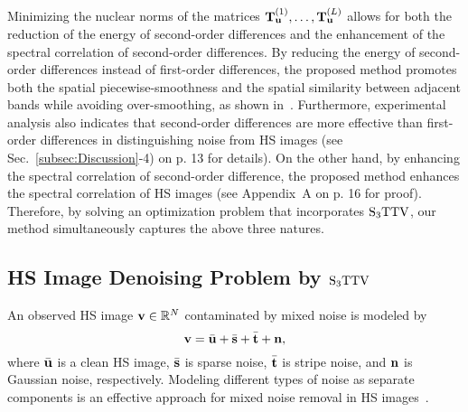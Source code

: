 Minimizing the nuclear norms of the matrices $\mathbf{T}_{\mathbf{u}}^{(1)}, \ldots, \mathbf{T}_{\mathbf{u}}^{(L)}$ allows for both the reduction of the energy of second-order differences and the enhancement of the spectral correlation of second-order differences. By reducing the energy of second-order differences instead of first-order differences, the proposed method promotes both the spatial piecewise-smoothness and the spatial similarity between adjacent bands while avoiding over-smoothing, as shown in~\cite{Aggarwal2016SSTV}. Furthermore, experimental analysis also indicates that second-order differences are more effective than first-order differences in distinguishing noise from HS images (see Sec.~\ref{subsec:Discussion}-4) on p. 13 for details). On the other hand, by enhancing the spectral correlation of second-order difference, the proposed method enhances the spectral correlation of HS images (see Appendix~A on p. 16 for proof). Therefore, by solving an optimization problem that incorporates ${\text{S}_{3} \text{TTV}}$, our method simultaneously captures the above three natures.


\subsection{HS Image Denoising Problem by ${\text{S}_{3} \text{TTV}}$}
\label{subsec:HSI_Denoising_Problem}
An observed HS image $\mathbf{v} \in \mathbb{R}^{N}$ contaminated by mixed noise is modeled by
\begin{equation}
	\label{eq:Obsevation_model}
	\mathbf{v} = \bar{\mathbf{u}} + \bar{\mathbf{s}} + \bar{\mathbf{t}} + \mathbf{n},
\end{equation}
where $\bar{\mathbf{u}}$ is a clean HS image, $\bar{\mathbf{s}}$ is sparse noise, $\bar{\mathbf{t}}$ is stripe noise, and $\mathbf{n}$ is Gaussian noise, respectively.
Modeling different types of noise as separate components is an effective approach for mixed noise removal in HS images~\cite{Zhang2022Double}.

